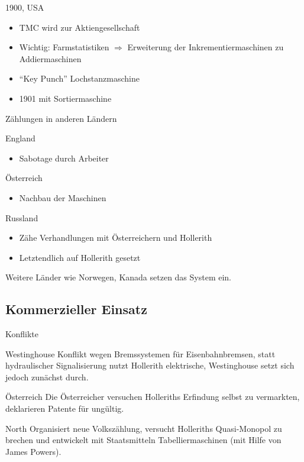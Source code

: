 \documentclass[EU2]{beamer}
\begin{document}
\begin{frame}{1900, USA}
  \begin{itemize}
    \item TMC wird zur Aktiengesellschaft
    \item Wichtig: Farmstatistiken $\Rightarrow$ Erweiterung der
      Inkrementiermaschinen zu Addiermaschinen
    \item \enquote{Key Punch} Lochstanzmaschine
    \item 1901 mit Sortiermaschine
  \end{itemize}
\end{frame}

\begin{frame}{Zählungen in anderen Ländern}
  \begin{block}{England}
    \begin{itemize}
      \item Sabotage durch Arbeiter
    \end{itemize}
  \end{block}
  \begin{block}{Österreich}
    \begin{itemize}
      \item Nachbau der Maschinen
    \end{itemize}
  \end{block}
  \begin{block}{Russland}
    \begin{itemize}
      \item Zähe Verhandlungen mit Österreichern und Hollerith
      \item Letztendlich auf Hollerith gesetzt
    \end{itemize}
  \end{block}
  Weitere Länder wie Norwegen, Kanada setzen das System ein.
\end{frame}

\subsection{Kommerzieller Einsatz}

\begin{frame}{Konflikte}
  \begin{block}{Westinghouse}
    Konflikt wegen Bremssystemen für Eisenbahnbremsen, statt hydraulischer
    Signalisierung nutzt Hollerith elektrische, Westinghouse setzt sich jedoch
    zunächst durch.
  \end{block}
  \begin{block}{Österreich}
    Die Österreicher versuchen Holleriths Erfindung selbst zu vermarkten,
    deklarieren Patente für ungültig.
  \end{block}
  \begin{block}{North}
    Organisiert neue Volkszählung, versucht Holleriths Quasi-Monopol zu brechen
    und entwickelt mit Staatsmitteln Tabelliermaschinen (mit Hilfe von James Powers).
  \end{block}
\end{frame}
\end{document}
